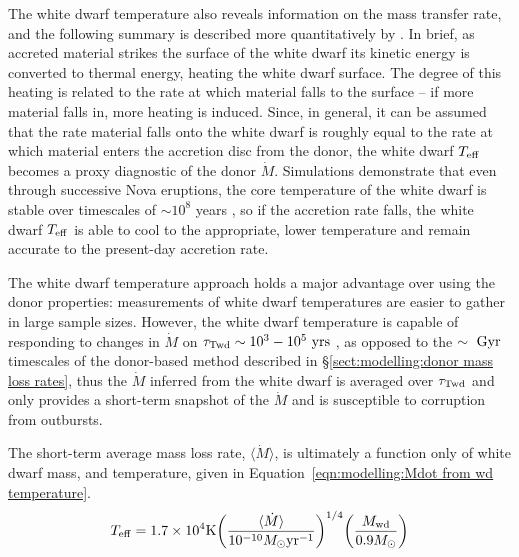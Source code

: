 The white dwarf temperature also reveals information on the mass transfer rate, and the following summary is described more quantitatively by \citet{townsley2009}.
In brief, as accreted material strikes the surface of the white dwarf its kinetic energy is converted to thermal energy, heating the white dwarf surface.
The degree of this heating is related to the rate at which material falls to the surface -- if more material falls in, more heating is induced.
Since, in general, it can be assumed that the rate material falls onto the white dwarf is roughly equal to the rate at which material enters the accretion disc from the donor, the white dwarf $T_{\rm eff}$ becomes a proxy diagnostic of the donor $\dot M$.
Simulations demonstrate that even through successive Nova eruptions, the core temperature of the white dwarf is stable over timescales of $\sim 10^8$ years \citep{epelstain2007}, so if the accretion rate falls, the white dwarf $T_{\rm eff}$ is able to cool to the appropriate, lower temperature and remain accurate to the present-day accretion rate.

The white dwarf temperature approach holds a major advantage over using the donor properties: measurements of white dwarf temperatures are easier to gather in large sample sizes.
However, the white dwarf temperature is capable of responding to changes in $\dot M$ on $\tau_{\rm Twd} \sim 10^3 - 10^5\ {\rm yrs}$ \citep{townsley2009}, as opposed to the $\rm \sim~Gyr$ timescales of the donor-based method described in \S\ref{sect:modelling:donor mass loss rates}, thus the $\dot M$ inferred from the white dwarf is averaged over $\tau_{\rm Twd}$ and only provides a short-term snapshot of the $\dot M$ and is susceptible to corruption from outbursts.

The short-term average mass loss rate, $\langle\dot M\rangle$, is ultimately a function only of white dwarf mass, and temperature, given in Equation~\ref{eqn:modelling:Mdot from wd temperature}.
\begin{equation}
    \label{eqn:modelling:Mdot from wd temperature}
    T_{\rm eff} = 1.7 \times 10^4 {\rm K} \bigg( \frac{\langle\dot M\rangle}{10^{-10} M_\odot {\rm yr}^{-1}} \bigg)^{1/4} \bigg( \frac{M_{\rm wd}}{0.9 M_\odot} \bigg)
\end{equation}

